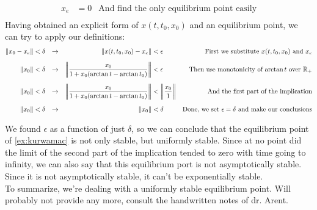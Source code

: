 {\begin{align*}
        x_e&=0&\mbox{And find the only equilibrium point easily}\\[1.25ex]
     \end{align*}
     Having obtained an explicit form of $x(t,t_0,x_0)$ and an equilibrium point, we can try to apply our definitions:
     \begin{align*}
         \norm{x_0-x_e} &<\delta &\rightarrow&& \norm{x(t,t_0,x_0) - x_e} &< \epsilon&\mbox{First we substitute $x(t,t_0,x_0)$ and $x_e$}\\[1.25ex]
     \norm{x_0} &< \delta &\rightarrow&& \norm[\bigg]{\frac{x_0}{1+x_0(\arctan{t}-\arctan{t_0})}}&<\epsilon&\mbox{Then use monotonicity of $\arctan{t}$ over $\mathbb{R}_+$}\\[1.25ex]
 \norm{x_0} &<\delta&\rightarrow && \norm[\bigg]{\frac{x_0}{1+x_0(\arctan{t}-\arctan{t_0})}}&< \norm[\bigg]{\frac{x_0}{1}} & \mbox{And the first part of the implication}\\[1.25ex]
 \norm{x_0} &<\delta&\rightarrow && \norm{x_0}&< \delta & \mbox{Done, we set $\epsilon = \delta$ and make our conclusions}\\[1.25ex]
     \end{align*}
We found $\epsilon$ as a function of just $\delta$, so we can conclude that the equilibrium point of  \ref{ex:kurwamac} is not only stable, but uniformly stable. Since at no point did the limit of the second part of the implication tended to zero with time going to infinity, we can also say that this equilibrium port is not asymptotically stable. Since it is not asymptotically stable, it can't be exponentially stable.\\
To summarize, we're dealing with a uniformly stable equilibrium point.
}
Will probably not provide any more, consult the handwritten notes of dr. Arent.
\clearpage

